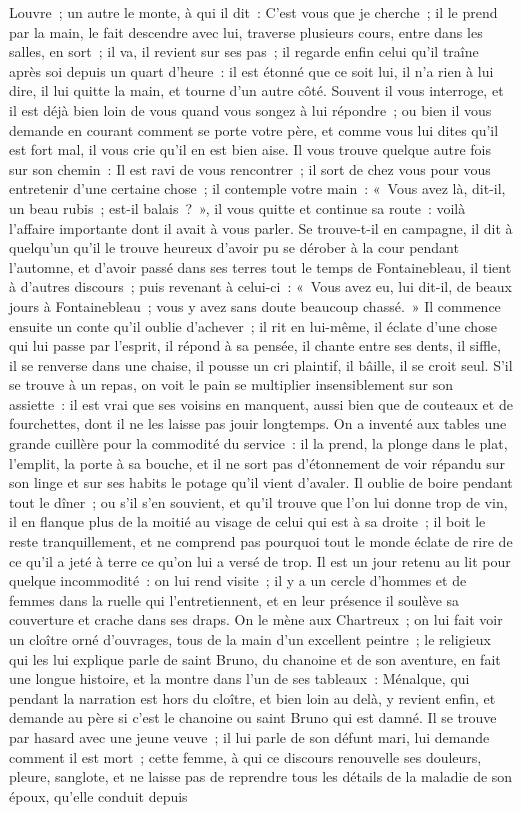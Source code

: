 \documentclass[french,twoside]{book} %
\begin{document}
Louvre ; un autre le monte, à qui il dit : C'est vous que je cherche ; il le prend par la main, le fait descendre avec lui, traverse plusieurs cours, entre dans les salles, en sort ; il va, il revient sur ses pas ; il regarde enfin celui qu’il traîne après soi depuis un quart d’heure : il est étonné que ce soit lui, il n’a rien à lui dire, il lui quitte la main, et tourne d’un autre côté. Souvent il vous interroge, et il est déjà bien loin de vous quand vous songez à lui répondre ; ou bien il vous demande en courant comment se porte votre père, et comme vous lui dites qu’il est fort mal, il vous crie qu’il en est bien aise. Il vous trouve quelque autre fois sur son chemin : Il est ravi de vous rencontrer ; il sort de chez vous pour vous entretenir d’une certaine chose ; il contemple votre main : « Vous avez là, dit-il, un beau rubis ; est-il balais ? », il vous quitte et continue sa route : voilà l’affaire importante dont il avait à vous parler. Se trouve-t-il en campagne, il dit à quelqu’un qu’il le trouve heureux d’avoir pu se dérober à la cour pendant l’automne, et d’avoir passé dans ses terres tout le temps de Fontainebleau, il tient à d’autres discours ; puis revenant à celui-ci : « Vous avez eu, lui dit-il, de beaux jours à Fontainebleau ; vous y avez sans doute beaucoup chassé. » Il commence ensuite un conte qu’il oublie d’achever ; il rit en lui-même, il éclate d’une chose qui lui passe par l’esprit, il répond à sa pensée, il chante entre ses dents, il siffle, il se renverse dans une chaise, il pousse un cri plaintif, il bâille, il se croit seul. S'il se trouve à un repas, on voit le pain se multiplier insensiblement sur son assiette : il est vrai que ses voisins en manquent, aussi bien que de couteaux et de fourchettes, dont il ne les laisse pas jouir longtemps. On a inventé aux tables une grande cuillère pour la commodité du service : il la prend, la plonge dans le plat, l’emplit, la porte à sa bouche, et il ne sort pas d’étonnement de voir répandu sur son linge et sur ses habits le potage qu’il vient d’avaler. Il oublie de boire pendant tout le dîner ; ou s’il s’en souvient, et qu’il trouve que l’on lui donne trop de vin, il en flanque plus de la moitié au visage de celui qui est à sa droite ; il boit le reste tranquillement, et ne comprend pas pourquoi tout le monde éclate de rire de ce qu’il a jeté à terre ce qu’on lui a versé de trop. Il est un jour retenu au lit pour quelque incommodité : on lui rend visite ; il y a un cercle d’hommes et de femmes dans la ruelle qui l’entretiennent, et en leur présence il soulève sa couverture et crache dans ses draps. On le mène aux Chartreux ; on lui fait voir un cloître orné d’ouvrages, tous de la main d’un excellent peintre ; le religieux qui les lui explique parle de saint Bruno, du chanoine et de son aventure, en fait une longue histoire, et la montre dans l’un de ses tableaux : Ménalque, qui pendant la narration est hors du cloître, et bien loin au delà, y revient enfin, et demande au père si c’est le chanoine ou saint Bruno qui est damné. Il se trouve par hasard avec une jeune veuve ; il lui parle de son défunt mari, lui demande comment il est mort ; cette femme, à qui ce discours renouvelle ses douleurs, pleure, sanglote, et ne laisse pas de reprendre tous les détails de la maladie de son époux, qu’elle conduit depuis 
\end{document}
